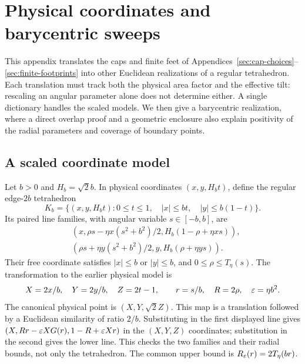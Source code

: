 \section{Physical coordinates and barycentric sweeps}
\label{sec:coordinate-realizations}

This appendix translates the caps and finite feet of
Appendices~\ref{sec:cap-choices}--\ref{sec:finite-footprints} into other
Euclidean realizations of a regular tetrahedron. Each translation must
track both the physical area factor and the effective tilt: rescaling an
angular parameter alone does not determine either. A single dictionary
handles the scaled models. We then give a barycentric realization, where
a direct overlap proof and a geometric enclosure also explain positivity
of the radial parameters and coverage of boundary points.

\subsection{A scaled coordinate model}

Let $b>0$ and $H_b=\sqrt2 b$. In physical coordinates
$(x,y,H_bt)$, define the regular edge-$2b$ tetrahedron
\[
 K_b=\{(x,y,H_bt):0\le t\le1,\quad
            |x|\le bt,\quad |y|\le b(1-t)\}.
\]
Its paired line families, with angular variable $s\in[-b,b]$, are
\begin{align*}
 &(x,\rho s-\eta x(s^2+b^2)/2,
                  H_b(1-\rho+\eta xs)),\\
 &(\rho s+\eta y(s^2+b^2)/2,y,
                  H_b(\rho+\eta ys)).
\end{align*}
Their free coordinate satisfies $|x|\le b$ or $|y|\le b$, and
$0\le\rho\le T_\eta(s)$. The transformation to the earlier physical
model is
\begin{equation}\label{eq:halfheight-dictionary}
 X=2x/b,\quad Y=2y/b,\quad Z=2t-1,
 \qquad r=s/b,\quad R=2\rho,\quad \varepsilon=\eta b^2.
\end{equation}
The canonical physical point is $(X,Y,\sqrt2 Z)$. This map is a
translation followed by a Euclidean similarity of ratio $2/b$.
Substituting in the first displayed line gives
$(X,Rr-\varepsilon XG(r),1-R+\varepsilon Xr)$ in the $(X,Y,Z)$ coordinates;
substitution in the second gives the lower line. This checks the two
families and their radial bounds, not only the tetrahedron.
The common upper bound is $R_\varepsilon(r)=2T_\eta(br)$.


